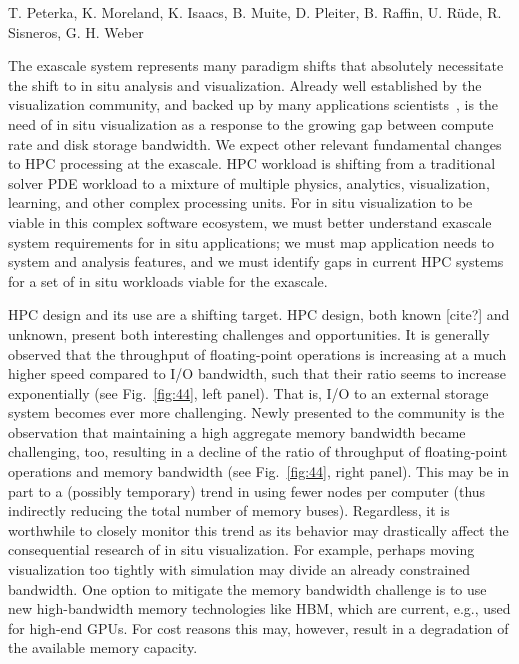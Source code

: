 
\license

 T. Peterka, K. Moreland, K. Isaacs, B. Muite, D. Pleiter, B. Raffin, U.  Rüde, R. Sisneros, G. H. Weber

\begin{refsection}

The exascale system represents many paradigm shifts that absolutely necessitate the shift to in situ analysis and visualization. Already well established by the visualization community, and backed up by many applications scientists~\cite{Gerber17}, is the need of in situ visualization as a response to the growing gap between compute rate and disk storage bandwidth.
We expect other relevant fundamental changes to HPC processing at the exascale. HPC workload is shifting from a traditional solver PDE workload to a mixture of multiple physics, analytics, visualization, learning, and other complex processing units. For in situ visualization to be viable in this complex software ecosystem, we must better understand exascale system requirements for in situ applications; we must map application needs to system and analysis features, and we must identify gaps in current HPC systems for a set of in situ workloads viable for the exascale.

HPC design and its use are a shifting target. HPC design, both known [cite?] and unknown, present both interesting challenges and opportunities.
It is generally observed that the throughput of floating-point operations is increasing at a much higher speed compared to I/O bandwidth, such that their ratio seems to increase exponentially (see Fig.~\ref{fig:44}, left panel). That is, I/O to an external storage system becomes ever more challenging. Newly presented to the community is the observation that maintaining a high aggregate memory bandwidth became challenging, too, resulting in a decline of the ratio of throughput of floating-point operations and memory bandwidth (see Fig.~\ref{fig:44}, right panel). This may be in part to a (possibly temporary) trend in using fewer nodes per computer (thus indirectly reducing the total number of memory buses). Regardless, it is worthwhile to closely monitor this trend as its behavior may drastically affect the consequential research of in situ visualization. For example, perhaps moving visualization too tightly with simulation may divide an already constrained bandwidth. One option to mitigate the memory bandwidth challenge is to use new high-bandwidth memory technologies like HBM, which are current, e.g., used for high-end GPUs. For cost reasons this may, however, result in a degradation of the available memory capacity.


\end{refsection}
